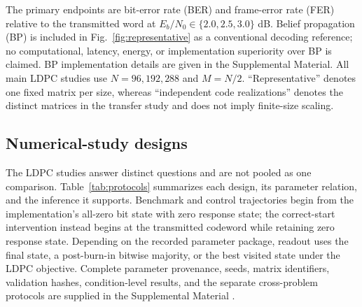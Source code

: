 \documentclass[aps,prapplied,reprint,superscriptaddress,longbibliography,floatfix]{revtex4-2}
\begin{document}
The primary endpoints are bit-error rate (BER) and frame-error rate (FER) relative to the transmitted word at $E_b/N_0\in\{2.0,2.5,3.0\}$ dB.  Belief propagation (BP) is included in Fig.~\ref{fig:representative} as a conventional decoding reference; no computational, latency, energy, or implementation superiority over BP is claimed.  BP implementation details are given in the Supplemental Material.  All main LDPC studies use $N=96,192,288$ and $M=N/2$.  ``Representative'' denotes one fixed matrix per size, whereas ``independent code realizations'' denotes the distinct matrices in the transfer study and does not imply finite-size scaling.

\subsection{Numerical-study designs}

The LDPC studies answer distinct questions and are not pooled as one comparison.  Table~\ref{tab:protocols} summarizes each design, its parameter relation, and the inference it supports.  Benchmark and control trajectories begin from the implementation's all-zero bit state with zero response state; the correct-start intervention instead begins at the transmitted codeword while retaining zero response state.  Depending on the recorded parameter package, readout uses the final state, a post-burn-in bitwise majority, or the best visited state under the LDPC objective.  Complete parameter provenance, seeds, matrix identifiers, validation hashes, condition-level results, and the separate cross-problem protocols are supplied in the Supplemental Material \cite{supplement}.
\end{document}
